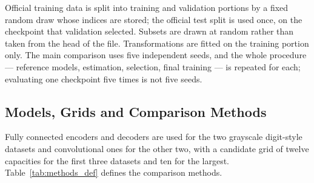\documentclass[make,article,submit,pdftex,moreauthors]{Definitions/mdpi}
\begin{document}
Official training data is split into training and validation portions by a
fixed random draw whose indices are stored; the official test split is
used once, on the checkpoint that validation selected. Subsets are drawn
at random rather than taken from the head of the file. Transformations are
fitted on the training portion only. The main comparison uses five
independent seeds, and the whole procedure --- reference models,
estimation, selection, final training --- is repeated for each; evaluating
one checkpoint five times is not five seeds.

\subsection{Models, Grids and Comparison Methods}\label{sec:setup_methods}

Fully connected encoders and decoders are used for the two
grayscale digit-style datasets and convolutional ones for the other two,
with a candidate grid of twelve capacities for the first three datasets
and ten for the largest. Table~\ref{tab:methods_def} defines the
comparison methods.
\end{document}

